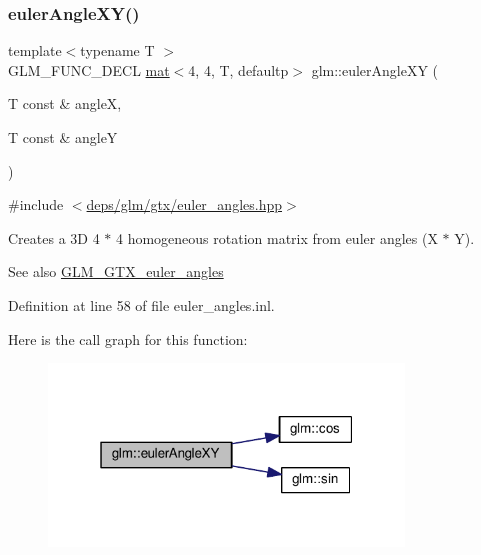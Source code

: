 \subsubsection{\texorpdfstring{euler\+Angle\+X\+Y()}{eulerAngleXY()}}
{\footnotesize\ttfamily template$<$typename T $>$ \\
G\+L\+M\+\_\+\+F\+U\+N\+C\+\_\+\+D\+E\+CL \hyperlink{structglm_1_1mat}{mat}$<$4, 4, T, defaultp$>$ glm\+::euler\+Angle\+XY (\begin{DoxyParamCaption}\item[{T const \&}]{angleX,  }\item[{T const \&}]{angleY }\end{DoxyParamCaption})}



{\ttfamily \#include $<$\hyperlink{euler__angles_8hpp}{deps/glm/gtx/euler\+\_\+angles.\+hpp}$>$}

Creates a 3D 4 $\ast$ 4 homogeneous rotation matrix from euler angles (X $\ast$ Y). \begin{DoxySeeAlso}{See also}
\hyperlink{group__gtx__euler__angles}{G\+L\+M\+\_\+\+G\+T\+X\+\_\+euler\+\_\+angles} 
\end{DoxySeeAlso}


Definition at line 58 of file euler\+\_\+angles.\+inl.

Here is the call graph for this function\+:
\nopagebreak
\begin{figure}[H]
\begin{center}
\leavevmode
\includegraphics[width=268pt]{d2/d7e/group__gtx__euler__angles_ga64036577ee17a2d24be0dbc05881d4e2_cgraph}
\end{center}
\end{figure}
\mbox{\label{group__gtx__euler__angles_ga1975e0f0e9bed7f716dc9946da2ab645}} 
